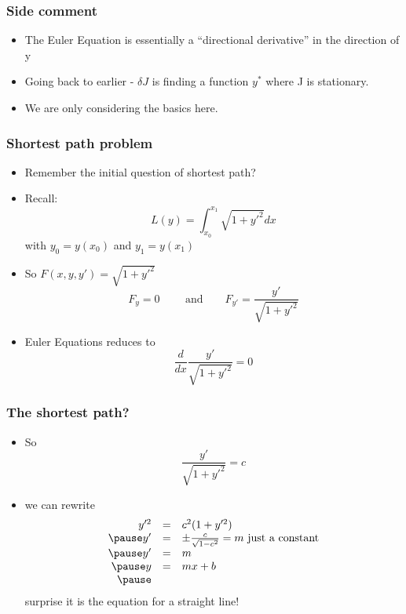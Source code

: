 \documentclass[10pt]{beamer}
\begin{document}
\begin{frame}
  \frametitle{Side comment}
  \begin{itemize}
  \item The Euler Equation is essentially a ``directional derivative''
    in the direction of y
  \item Going back to earlier - $\delta J$ is finding a function $y^*$
    where J is stationary. 
  \item We are only considering the basics here. 
  \end{itemize}
\end{frame}

\begin{frame}
  \frametitle{Shortest path problem}
  \begin{itemize}
  \item Remember the initial question of shortest path? 
  \item Recall:
    \[
      L(y) = \int_{x_0}^{x_1} \sqrt{1 + y'^2} dx
    \] with $y_0 = y(x_0)$ and $y_1 = y(x_1)$
  \item So $F(x, y, y') = \sqrt{1 + y'^2}$
    \[
      F_y = 0 \mbox{~~~~~~ and ~~~~~} F_{y'} = \frac{y'}{\sqrt{1+y'^2}}
    \]    
  \item Euler Equations reduces to
    \[
      \frac{d}{dx} \frac{y'}{ \sqrt{1+y'^2} } = 0
    \]
  \end{itemize}
\end{frame}

\begin{frame}
  \frametitle{The shortest path?}
  \begin{itemize}
  \item So 
    \[
      \frac{ y' }{ \sqrt{1+y'^2} } = c
    \]
  \item we can rewrite
    \[
      \begin{array}{rcl}
        y'^2& = & c^2 (1+y'^2)\\ \pause
        y'  & = & \pm \frac{c}{\sqrt{1-c^2}} = m \mbox{ ~~ just a constant} \\ \pause
        y'  & = & m\\ \pause
        y   & = & mx + b \\ \pause
      \end{array}
    \]
    surprise it is the equation for a straight line!
    
  \end{itemize}
\end{frame}
\end{document}
